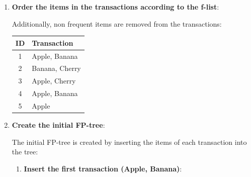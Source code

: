 \documentclass[
english,
smallborders
]{i6prcsht}
\begin{document}
\begin{solution}
\begin{enumerate}
		      \begin{itemize}	
			      \item Apple $\rightarrow$ Banana $\rightarrow$ Cherry
		      \end{itemize}
		      
		\item \textbf{Order the items in the transactions according to the f-list}:
		      
		      Additionally, non frequent items are removed from the transactions:
		      
		      \begin{center}	
			      \begin{tabular}{|c|l|}
				      \hline
				      \textbf{ID} & \textbf{Transaction} \\
				      \hline
				      1           & Apple, Banana        \\
				      \hline
				      2           & Banana, Cherry       \\
				      \hline
				      3           & Apple, Cherry        \\
				      \hline
				      4           & Apple, Banana        \\
				      \hline
				      5           & Apple                \\
				      \hline
			      \end{tabular}
		      \end{center}
		      
		      \newpage
		      
		\item \textbf{Create the initial FP-tree}:
		      
		      The initial FP-tree is created by inserting the items of each transaction into the tree:
		      
		      \begin{enumerate}	
			      \item \textbf{Insert the first transaction (Apple, Banana)}:
			            
			            \begin{center}	
\end{center}
\end{enumerate}
\end{enumerate}
\end{solution}
\end{document}
